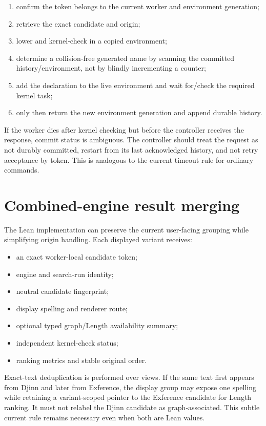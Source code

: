 \documentclass[10pt,letterpaper,oneside]{report}
\begin{document}
\begin{enumerate}
  \item confirm the token belongs to the current worker and environment generation;
  \item retrieve the exact candidate and origin;
  \item lower and kernel-check in a copied environment;
  \item determine a collision-free generated name by scanning the committed history/environment, not by blindly incrementing a counter;
  \item add the declaration to the live environment and wait for/check the required kernel task;
  \item only then return the new environment generation and append durable history.
\end{enumerate}

If the worker dies after kernel checking but before the controller receives the response, commit status is ambiguous. The controller should treat the request as not durably committed, restart from its last acknowledged history, and not retry acceptance by token. This is analogous to the current timeout rule for ordinary commands.

\section{Combined-engine result merging}

The Lean implementation can preserve the current user-facing grouping while simplifying origin handling. Each displayed variant receives:

\begin{itemize}
  \item an exact worker-local candidate token;
  \item engine and search-run identity;
  \item neutral candidate fingerprint;
  \item display spelling and renderer route;
  \item optional typed graph/Length availability summary;
  \item independent kernel-check status;
  \item ranking metrics and stable original order.
\end{itemize}

Exact-text deduplication is performed over views. If the same text first appears from Djinn and later from Exference, the display group may expose one spelling while retaining a variant-scoped pointer to the Exference candidate for Length ranking. It must not relabel the Djinn candidate as graph-associated. This subtle current rule remains necessary even when both are Lean values.
\end{document}
